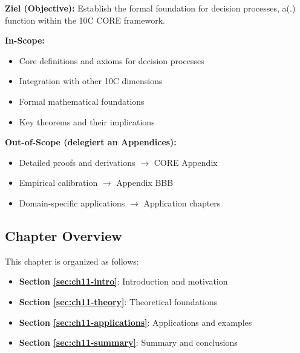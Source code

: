 \begin{tcolorbox}[
    colback=purple!5!white,
    colframe=purple!75!black,
    title={\textbf{Chapter Scope: Ziel / In-Scope / Out-of-Scope}},
    fonttitle=\bfseries
]

\textbf{Ziel (Objective):}
Establish the formal foundation for decision processes, a(.) function within the 10C CORE framework.

\vspace{0.3cm}
\textbf{In-Scope:}
\begin{itemize}[nosep]
    \item Core definitions and axioms for decision processes
    \item Integration with other 10C dimensions
    \item Formal mathematical foundations
    \item Key theorems and their implications
\end{itemize}

\vspace{0.3cm}
\textbf{Out-of-Scope (delegiert an Appendices):}
\begin{itemize}[nosep]
    \item Detailed proofs and derivations $\rightarrow$ CORE Appendix
    \item Empirical calibration $\rightarrow$ Appendix BBB
    \item Domain-specific applications $\rightarrow$ Application chapters
\end{itemize}

\end{tcolorbox}



\subsection*{Chapter Overview}

This chapter is organized as follows:

\begin{itemize}
\item \textbf{Section \ref{sec:ch11-intro}}: Introduction and motivation
\item \textbf{Section \ref{sec:ch11-theory}}: Theoretical foundations
\item \textbf{Section \ref{sec:ch11-applications}}: Applications and examples
\item \textbf{Section \ref{sec:ch11-summary}}: Summary and conclusions
\end{itemize}



